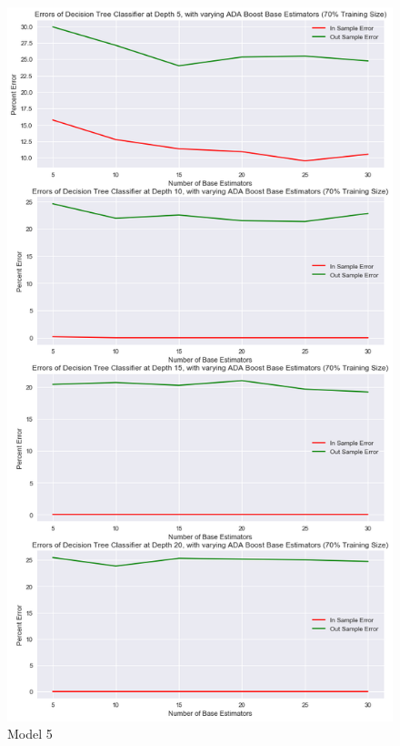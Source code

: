\documentclass[10pt,twocolumn]{article}
\begin{document}
\begin{figure}[!t]
  \begin{center}
    \includegraphics[width=\textwidth,height=\textheight,keepaspectratio]{ada_boost.png}
  \end{center}

  \caption{\small Model 5}
  \label{fig-1}
\end{figure}
\end{document}
